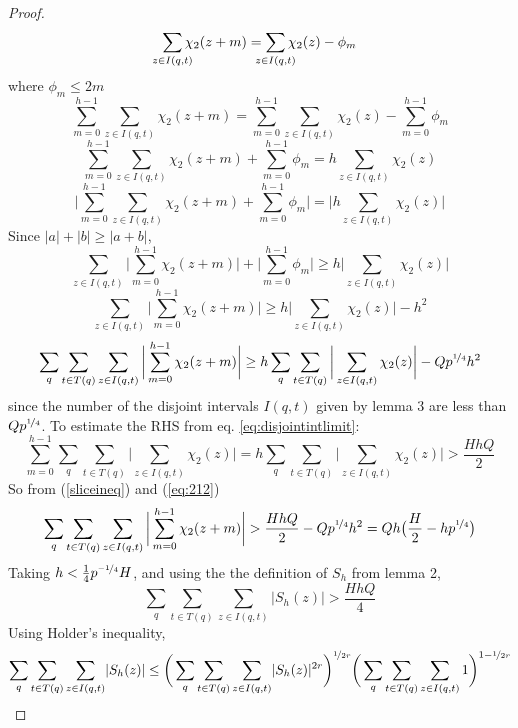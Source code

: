 \documentclass{report}
\begin{document}
\begin{proof}
$$\sum\limits_{\mathclap {z\in I(q,t)}}\chi_2(z+m) = \sum\limits_{\mathclap{z\in I(q,t)}}\chi_2(z)- \phi_m$$
where $\phi_m\leq 2m$
$$\sum\limits_{m=0}^{h-1}\sum\limits_{z\in I(q,t)}\chi_2(z+m) = \sum\limits_{m=0}^{h-1}\sum\limits_{z\in I(q,t)}\chi_2(z)- \sum\limits_{m=0}^{h-1}\phi_m$$
$$\sum\limits_{m=0}^{h-1}\sum\limits_{z\in I(q,t)}\chi_2(z+m) + \sum\limits_{m=0}^{h-1}\phi_m= h\sum\limits_{z\in I(q,t)}\chi_2(z)$$
$$\bigg \lvert\sum\limits_{m=0}^{h-1}\sum\limits_{z\in I(q,t)}\chi_2(z+m) + \sum\limits_{m=0}^{h-1}\phi_m \bigg \rvert= \bigg \lvert h\sum\limits_{z\in I(q,t)}\chi_2(z)\bigg \rvert$$
Since $\lvert a\rvert + \lvert b\rvert \geq \lvert a+b \rvert$,
$$\sum\limits_{z\in I(q,t)}\bigg \lvert \sum\limits_{m=0}^{h-1}\chi_2(z+m) \bigg \rvert + \bigg\lvert\sum\limits_{m=0}^{h-1}\phi_m\bigg\rvert \geq h\bigg \lvert \sum\limits_{z\in I(q,t)}\chi_2(z)\bigg \rvert$$
$$\sum\limits_{z\in I(q,t)}\bigg \lvert \sum\limits_{m=0}^{h-1}\chi_2(z+m) \bigg \rvert \geq h\bigg \lvert \sum\limits_{z\in I(q,t)}\chi_2(z)\bigg \rvert-h^2 $$
\begin{equation} \label{eq:212}
\sum_q\sum\limits_{t\in T(q)}\sum\limits_{z\in I(q,t)}\bigg \lvert \sum\limits_{m=0}^{h-1}\chi_2(z+m) \bigg \rvert \geq h\sum_q\sum\limits_{t\in T(q)}\bigg \lvert \sum\limits_{z\in I(q,t)}\chi_2(z)\bigg \rvert-Qp^{\nicefrac{1}{4}}h^2
\end{equation}
since the number of the disjoint intervals $I(q,t)$ given by lemma 3 are less than $Qp^{\nicefrac{1}{4}}$. To estimate the RHS from eq. \ref{eq:disjointintlimit}:
\begin{equation} \label{sliceineq}
\sum\limits_{m=0}^{h-1}\sum_q\sum\limits_{t\in T(q)}\bigg \lvert\sum\limits_{z\in I(q,t)}\chi_2(z)\bigg \rvert = h \sum_q\sum\limits_{t\in T(q)}\bigg \lvert\sum\limits_{z\in I(q,t)}\chi_2(z)\bigg \rvert > \frac{HhQ}{2}
\end{equation}
So from (\ref{sliceineq}) and (\ref{eq:212})
$$\sum_q\sum\limits_{t\in T(q)}\sum\limits_{z\in I(q,t)}\bigg \lvert \sum\limits_{m=0}^{h-1}\chi_2(z+m) \bigg \rvert > \frac{HhQ}{2}-Qp^{\nicefrac{1}{4}} h^2=Qh\big(\frac{H}{2}-hp^{\nicefrac{1}{4}}\big)$$
Taking $h<\frac{1}{4}p^{\nicefrac{-1}{4}}H$, and using the the definition of $S_h$ from lemma 2,
$$\sum_q\sum\limits_{t\in T(q)}\sum\limits_{z\in I(q,t)}\lvert S_h(z) \rvert > \frac{HhQ}{4}$$
Using Holder's inequality,
$$\sum_q\sum\limits_{t\in T(q)}\sum\limits_{z\in I(q,t)}\lvert S_h(z) \rvert \leq \bigg ( \sum_q\sum\limits_{t\in T(q)}\sum\limits_{z\in I(q,t)}\lvert S_h(z) \rvert^{2r} \bigg )^{\nicefrac{1}{2r}}\bigg ( \sum_q\sum\limits_{t\in T(q)}\sum\limits_{z\in I(q,t)}1 \bigg )^{1-\nicefrac{1}{2r}}$$

\end{proof}
\end{document}
